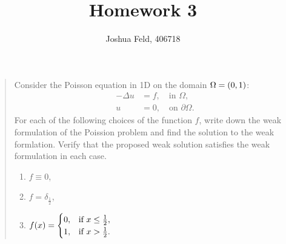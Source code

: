\documentclass[english]{exercise}
\title{Homework 3}
\author{Joshua Feld, 406718}
\begin{document}
	\maketitle


	\section{}

	\begin{quote}
		Consider the Poisson equation in 1D on the domain \(\Omega = \parentheses*{0, 1}\):
		\begin{align*}
			-\Delta u &= f, \quad \text{in }\Omega,\\
			u &= 0, \quad \text{on }\partial\Omega.
		\end{align*}
		For each of the following choices of the function \(f\), write down the weak formulation of the Poission problem and find the solution to the weak formlation.
		Verify that the proposed weak solution satisfies the weak formulation in each case.
		\begin{enumerate}
			\item \(f \equiv 0\),
			\item \(f = \delta_{\frac{1}{2}}\),
			\item \(f\parentheses*{x} = \begin{cases}
				0, & \text{if }x \le \frac{1}{2},\\
				1, & \text{if }x > \frac{1}{2}.
			\end{cases}\)
		\end{enumerate}
	\end{quote}
\end{document}
